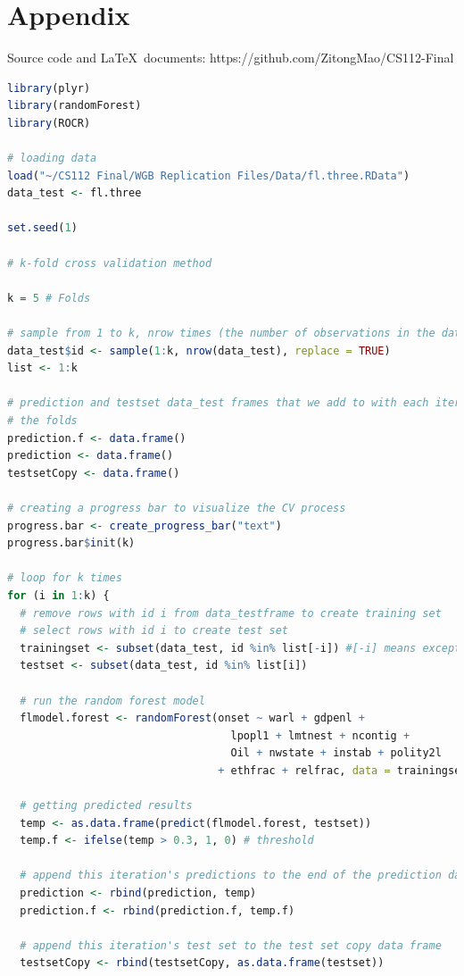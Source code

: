 \documentclass{article}
\begin{document}
\section{Appendix}
Source code and \LaTeX\ documents: https://github.com/ZitongMao/CS112-Final

\begin{lstlisting}[language=R, caption=k-fold Cross Validation: Random Forest as an example]
library(plyr)
library(randomForest)
library(ROCR)

# loading data
load("~/CS112 Final/WGB Replication Files/Data/fl.three.RData")
data_test <- fl.three

set.seed(1)

# k-fold cross validation method

k = 5 # Folds

# sample from 1 to k, nrow times (the number of observations in the data_test)
data_test$id <- sample(1:k, nrow(data_test), replace = TRUE)
list <- 1:k

# prediction and testset data_test frames that we add to with each iteration over
# the folds
prediction.f <- data.frame()
prediction <- data.frame()
testsetCopy <- data.frame()

# creating a progress bar to visualize the CV process
progress.bar <- create_progress_bar("text")
progress.bar$init(k)

# loop for k times
for (i in 1:k) {
  # remove rows with id i from data_testframe to create training set
  # select rows with id i to create test set
  trainingset <- subset(data_test, id %in% list[-i]) #[-i] means except i
  testset <- subset(data_test, id %in% list[i])
  
  # run the random forest model
  flmodel.forest <- randomForest(onset ~ warl + gdpenl + 
                                   lpopl1 + lmtnest + ncontig + 
                                   Oil + nwstate + instab + polity2l
                                 + ethfrac + relfrac, data = trainingset, importance = TRUE)
  
  # getting predicted results
  temp <- as.data.frame(predict(flmodel.forest, testset))
  temp.f <- ifelse(temp > 0.3, 1, 0) # threshold
  
  # append this iteration's predictions to the end of the prediction data_test frame
  prediction <- rbind(prediction, temp)
  prediction.f <- rbind(prediction.f, temp.f)
  
  # append this iteration's test set to the test set copy data frame
  testsetCopy <- rbind(testsetCopy, as.data.frame(testset))
  

\end{lstlisting}
\end{document}
